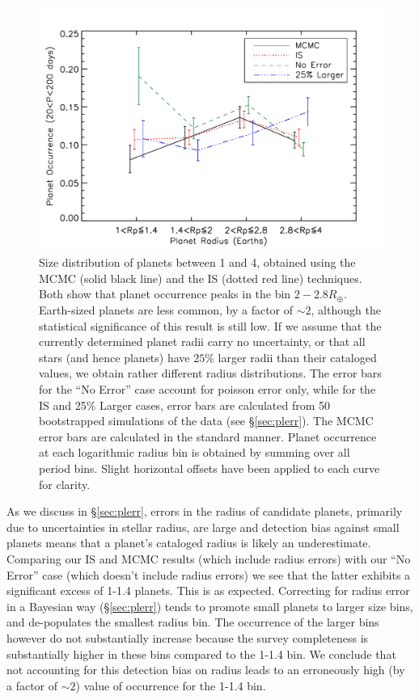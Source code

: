 %
\begin{figure}
\centerline{\includegraphics[scale=0.55]{chap2/Silburt_Rdist_all.pdf}}
\caption{Size distribution of planets between 1 and 4\rearth{},
  obtained using the MCMC (solid black line) and the IS (dotted red
  line) techniques. Both show that planet occurrence peaks in the bin
  $2-2.8 R_\oplus$. Earth-sized planets are less common, by a factor
  of $\sim 2$, although the statistical significance of this result is
  still low. If we assume that the currently determined planet radii
  carry no uncertainty, or that all stars (and hence planets) have
  $25\%$ larger radii than their cataloged values,
  we obtain rather different radius distributions. The error bars for
  the ``No Error'' case account for poisson error only, while for the
  IS and 25$\%$ Larger cases, error bars are calculated from 50 bootstrapped
  simulations of the data (see \S \ref{sec:plerr}). The MCMC error bars are 
  calculated in the standard manner. Planet occurrence at
  each logarithmic radius bin is obtained by summing over all period
  bins.  Slight horizontal offsets have been applied to each curve for clarity.}
\label{fig:raddist}
\end{figure}
  
As we discuss in \S \ref{sec:plerr}, errors in the radius of candidate
\kep{} planets, primarily due to uncertainties in stellar radius, are
large and detection bias against small planets means that a planet's
cataloged radius is likely an underestimate. Comparing our IS and MCMC 
results (which include radius errors) with our ``No Error'' case (which 
doesn't include radius errors) we see that the latter exhibits a significant excess of
1-1.4\rearth{} planets. This is as expected. Correcting for radius error in a
Bayesian way (\S \ref{sec:plerr}) tends to promote small planets to
larger size bins, and de-populates the smallest radius bin. The occurrence of
the larger bins however do not substantially increase because the survey 
completeness is substantially higher in these bins compared to the 
1-1.4\rearth{} bin. We conclude that not accounting for this detection bias 
on radius leads to an erroneously high (by a factor of $\sim 2$)
value of occurrence for the 1-1.4\rearth{} bin.

